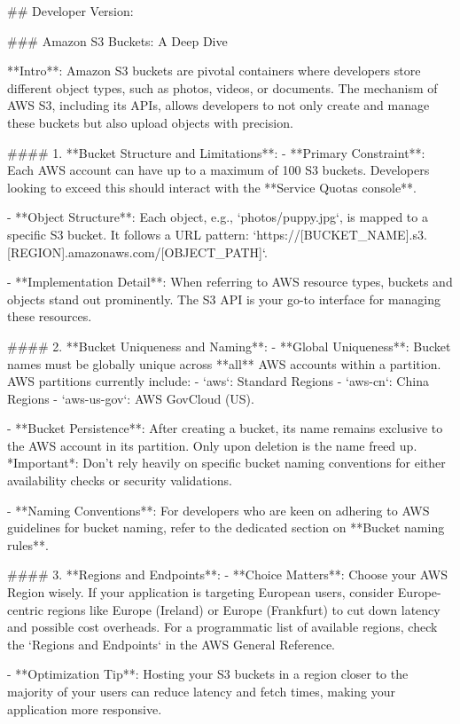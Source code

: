 ## Developer Version:

### Amazon S3 Buckets: A Deep Dive

**Intro**: Amazon S3 buckets are pivotal containers where developers store different object types, such as photos, videos, or documents. The mechanism of AWS S3, including its APIs, allows developers to not only create and manage these buckets but also upload objects with precision.

#### 1. **Bucket Structure and Limitations**:
- **Primary Constraint**: Each AWS account can have up to a maximum of 100 S3 buckets. Developers looking to exceed this should interact with the **Service Quotas console**.
  
- **Object Structure**: Each object, e.g., `photos/puppy.jpg`, is mapped to a specific S3 bucket. It follows a URL pattern: `https://[BUCKET_NAME].s3.[REGION].amazonaws.com/[OBJECT_PATH]`.
  
- **Implementation Detail**: When referring to AWS resource types, buckets and objects stand out prominently. The S3 API is your go-to interface for managing these resources.

#### 2. **Bucket Uniqueness and Naming**:
- **Global Uniqueness**: Bucket names must be globally unique across **all** AWS accounts within a partition. AWS partitions currently include: 
  - `aws`: Standard Regions
  - `aws-cn`: China Regions
  - `aws-us-gov`: AWS GovCloud (US).

- **Bucket Persistence**: After creating a bucket, its name remains exclusive to the AWS account in its partition. Only upon deletion is the name freed up. *Important*: Don't rely heavily on specific bucket naming conventions for either availability checks or security validations.

- **Naming Conventions**: For developers who are keen on adhering to AWS guidelines for bucket naming, refer to the dedicated section on **Bucket naming rules**.

#### 3. **Regions and Endpoints**:
- **Choice Matters**: Choose your AWS Region wisely. If your application is targeting European users, consider Europe-centric regions like Europe (Ireland) or Europe (Frankfurt) to cut down latency and possible cost overheads. For a programmatic list of available regions, check the `Regions and Endpoints` in the AWS General Reference.

- **Optimization Tip**: Hosting your S3 buckets in a region closer to the majority of your users can reduce latency and fetch times, making your application more responsive.

